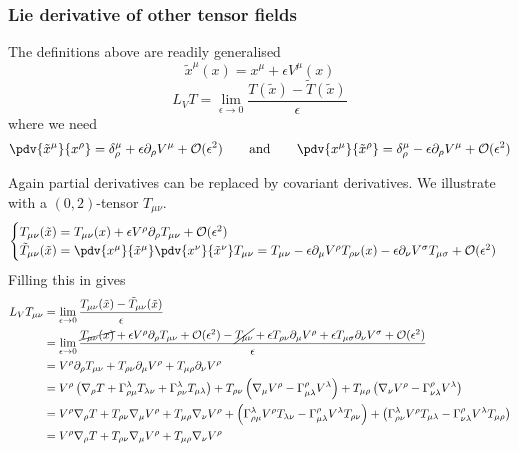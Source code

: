 \subsubsection{Lie derivative of other tensor fields}
The definitions above are readily generalised
\[ \tilde{x}^\mu(x) = x^\mu +\epsilon V^\mu(x) \]
\[ L_VT = \lim_{\epsilon\to 0} \frac{T(\tilde{x})-\tilde{T}(\tilde{x})}{\epsilon} \]
where we need
\[ \pdv{\tilde{x}^\mu}{x^\rho} = \delta^\mu_\rho + \epsilon \partial_\rho V^\mu + \mathcal{O}(\epsilon^2) \qquad \text{and}\qquad \pdv{x^\mu}{\tilde{x}^\rho} = \delta^\mu_\rho - \epsilon \partial_\rho V^\mu + \mathcal{O}(\epsilon^2) \]

Again partial derivatives can be replaced by covariant derivatives. We illustrate with a $(0,2)$-tensor $T_{\mu\nu}$.
\[ \begin{cases}
T_{\mu\nu}(\tilde{x}) = T_{\mu\nu}(x) + \epsilon V^\rho\partial_\rho T_{\mu\nu}+ \mathcal{O}(\epsilon^2) \\
\tilde{T}_{\mu\nu}(\tilde{x}) = \pdv{x^\mu}{\tilde{x}^\mu}\pdv{x^\nu}{\tilde{x}^\nu}T_{\mu\nu} = T_{\mu\nu} - \epsilon\partial_\mu V^\rho T_{\rho\nu}(x) - \epsilon\partial_\nu V^\sigma T_{\mu\sigma} + \mathcal{O}(\epsilon^2)
\end{cases} \]
Filling this in gives
\begin{align*}
L_V T_{\mu\nu} &= \lim_{\epsilon\to 0} \frac{T_{\mu\nu}(\tilde{x})-\tilde{T}_{\mu\nu}(\tilde{x})}{\epsilon} \\
&= \lim_{\epsilon\to 0} \frac{\cancel{T_{\mu\nu}(x)}+\epsilon V^\rho\partial_\rho T_{\mu\nu}+ \mathcal{O}(\epsilon^2)-\cancel{T_{\mu\nu}}+\epsilon T_{\rho\nu} \partial_\mu V^\rho +\epsilon T_{\mu\sigma} \partial_\nu V^\sigma + \mathcal{O}(\epsilon^2)}{\epsilon} \\
&= V^\rho\partial_\rho T_{\mu\nu} + T_{\rho\nu} \partial_\mu V^\rho + T_{\mu\rho} \partial_\nu V^\rho \\
&= V^\rho \left(\nabla_\rho T + \Gamma^\lambda_{\rho \mu}T_{\lambda \nu} + \Gamma^\lambda_{\rho \nu}T_{\mu \lambda} \right) + T_{\rho\nu} \left(\nabla_\mu V^\rho - \Gamma^\rho_{\mu\lambda}V^\lambda\right) + T_{\mu\rho} \left(\nabla_\nu V^\rho - \Gamma^\rho_{\nu\lambda}V^\lambda\right) \\
&= V^\rho\nabla_\rho T + T_{\rho\nu}\nabla_\mu V^\rho + T_{\mu\rho}\nabla_\nu V^\rho + \left(\Gamma^\lambda_{\rho \mu}V^\rho T_{\lambda \nu} - \Gamma^\rho_{\mu\lambda}V^\lambda T_{\rho\nu}\right) + \left(\Gamma^\lambda_{\rho \nu}V^\rho T_{\mu \lambda} - \Gamma^\rho_{\nu\lambda}V^\lambda T_{\mu\rho}\right) \\
&= V^\rho\nabla_\rho T + T_{\rho\nu}\nabla_\mu V^\rho + T_{\mu\rho}\nabla_\nu V^\rho
\end{align*}

